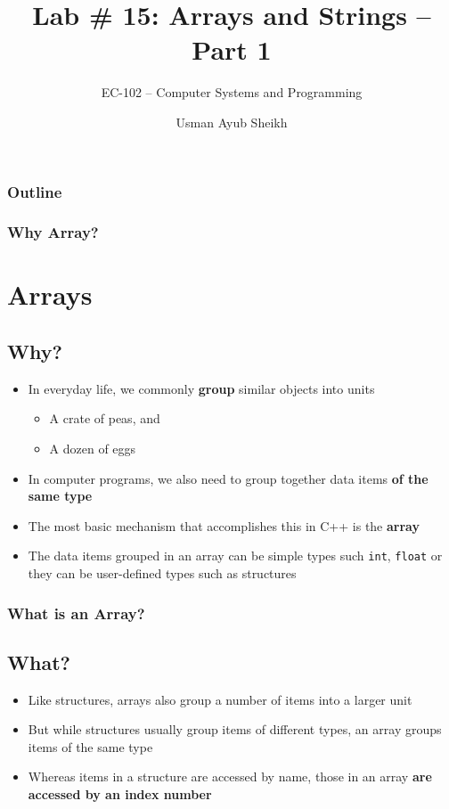 \documentclass{beamer}
\title{Lab \# 15: Arrays and Strings -- Part 1}
\subtitle{EC-102 -- Computer Systems and Programming}
\author{Usman Ayub Sheikh}
\institute{School of Mechanical and Manufacturing Engineering (SMME), \\ National University of Sciences and Technology (NUST)}
\date{\displaydate{date}}
\begin{document}
\begin{frame}
    \titlepage
\end{frame}

\begin{frame}
    \frametitle{Outline}
        \tableofcontents
\end{frame}

\begin{frame}\frametitle{Why Array?}
    \section{Arrays} %
    \label{sec:arrays}
    \subsection{Why?} %
    \label{sub:why_}
    \begin{itemize}
        \item In everyday life, we commonly \textbf{group} similar objects into units
        \begin{itemize}
            \item A crate of peas, and
            \item A dozen of eggs
         \end{itemize}
        \item In computer programs, we also need to group together data items \textbf{of the same type}
        \item The most basic mechanism that accomplishes this in C++ is the \textbf{array}
        \item The data items grouped in an array can be simple types such \texttt{int}, \texttt{float} or they can be user-defined types such as structures
    \end{itemize}
\end{frame}

\begin{frame}\frametitle{What is an Array?}
    \subsection{What?} %
    \label{sub:what_}
    \begin{itemize}
        \item Like structures, arrays also group a number of items into a larger unit
        \item But while structures usually group items of different types, an array groups items of the same type
        \item Whereas items in a structure are accessed by name, those in an array \textbf{are accessed by an index number}
    \end{itemize}
\end{frame}
\end{document}
